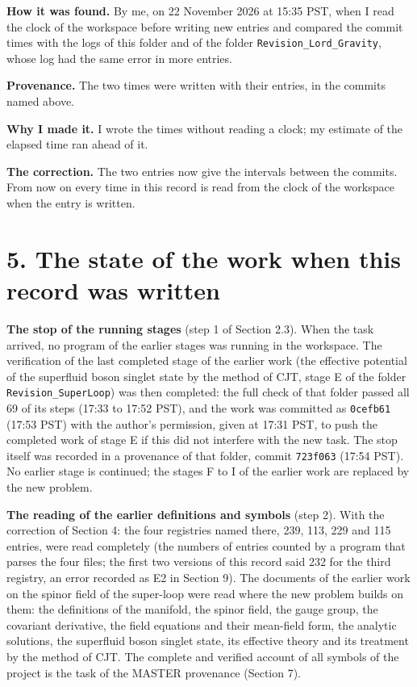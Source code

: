 \documentclass[
  10pt,
]{article}
\begin{document}
\textbf{How it was found.} By me, on 22 November 2026 at 15:35 PST, when
I read the clock of the workspace before writing new entries and
compared the commit times with the logs of this folder and of the folder
\texttt{Revision\_Lord\_Gravity}, whose log had the same error in more
entries.

\textbf{Provenance.} The two times were written with their entries, in
the commits named above.

\textbf{Why I made it.} I wrote the times without reading a clock; my
estimate of the elapsed time ran ahead of it.

\textbf{The correction.} The two entries now give the intervals between
the commits. From now on every time in this record is read from the
clock of the workspace when the entry is written.

\hypertarget{the-state-of-the-work-when-this-record-was-written}{%
\section{5. The state of the work when this record was
written}\label{the-state-of-the-work-when-this-record-was-written}}

\textbf{The stop of the running stages} (step 1 of Section 2.3). When
the task arrived, no program of the earlier stages was running in the
workspace. The verification of the last completed stage of the earlier
work (the effective potential of the superfluid boson singlet state by
the method of CJT, stage E of the folder \texttt{Revision\_SuperLoop})
was then completed: the full check of that folder passed all 69 of its
steps (17:33 to 17:52 PST), and the work was committed as
\texttt{0cefb61} (17:53 PST) with the author's permission, given at
17:31 PST, to push the completed work of stage E if this did not
interfere with the new task. The stop itself was recorded in a
provenance of that folder, commit \texttt{723f063} (17:54 PST). No
earlier stage is continued; the stages F to I of the earlier work are
replaced by the new problem.

\textbf{The reading of the earlier definitions and symbols} (step 2).
With the correction of Section 4: the four registries named there, 239,
113, 229 and 115 entries, were read completely (the numbers of entries
counted by a program that parses the four files; the first two versions
of this record said 232 for the third registry, an error recorded as E2
in Section 9). The documents of the earlier work on the spinor field of
the super-loop were read where the new problem builds on them: the
definitions of the manifold, the spinor field, the gauge group, the
covariant derivative, the field equations and their mean-field form, the
analytic solutions, the superfluid boson singlet state, its effective
theory and its treatment by the method of CJT. The complete and verified
account of all symbols of the project is the task of the MASTER
provenance (Section 7).
\end{document}
